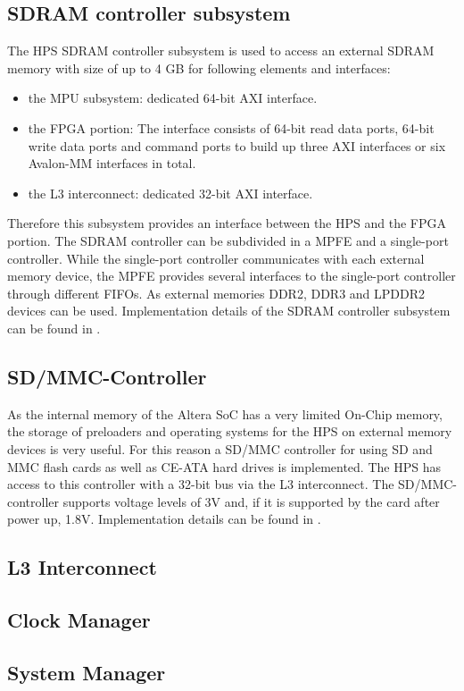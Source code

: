 \subsection{SDRAM controller subsystem}
The HPS SDRAM controller subsystem is used to access an external SDRAM memory with size of up to 4 GB for following elements and interfaces:
\begin{itemize}
\item the MPU subsystem: dedicated 64-bit AXI interface.
\item the FPGA portion: The interface consists of 64-bit read data ports, 64-bit write data ports and command ports to build up three AXI interfaces or six Avalon-MM interfaces in total.
\item the L3 interconnect: dedicated 32-bit AXI interface.
\end{itemize}
Therefore this subsystem provides an interface between the HPS and the FPGA portion. The SDRAM controller can be subdivided in a MPFE and a single-port controller. While the single-port controller communicates with each external memory device, the MPFE provides several interfaces to the single-port controller through different FIFOs. As external memories DDR2, DDR3 and LPDDR2 devices can be used. Implementation details of the SDRAM controller subsystem can be found in \cite[chapter 11]{AlteraHPS15}.
\subsection{SD/MMC-Controller}
As the internal memory of the Altera SoC has a very limited On-Chip memory, the storage of preloaders and operating systems for the HPS on external memory devices is very useful. For this reason a SD/MMC controller for using SD and MMC flash cards as well as CE-ATA hard drives is implemented. The HPS has access to this controller with a 32-bit bus via the L3 interconnect. The SD/MMC-controller supports voltage levels of 3V and, if it is supported by the card after power up, 1.8V. Implementation details can be found in \cite[chapter 14]{AlteraHPS15}.
\subsection{L3 Interconnect}
\subsection{Clock Manager}
\subsection{System Manager}
